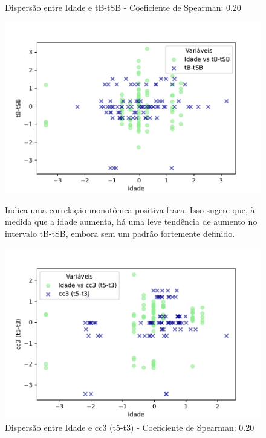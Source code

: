 \begin{figure}[h]
    \captionsetup{font=footnotesize, justification=centering, labelsep=period, position=above}
    \centering
    \begin{minipage}[b]{0.45\linewidth}
        \caption{Dispersão entre Idade e tB-tSB - Coeficiente de Spearman: 0.20}
        \label{fig:idade-tB-tSB}
        \centering
        \includegraphics[scale=0.47]{figuras/Spearman/idade-tB-tSB.pdf}
        \vspace{0.3cm}
        \caption{Indica uma correlação monotônica positiva fraca. Isso sugere que, à medida que a idade aumenta, há uma leve tendência de aumento no intervalo tB-tSB, embora sem um padrão fortemente definido. }
        \begin{minipage}{\linewidth}
            \centering
        \end{minipage}
    \end{minipage}
    \hspace{0.05\linewidth}
    \begin{minipage}[b]{0.45\linewidth}
        \caption{Dispersão entre Idade e cc3 (t5-t3) - Coeficiente de Spearman: 0.20}
        \label{fig:idade-cc3}
        \centering
        \includegraphics[scale=0.47]{figuras/Spearman/idade-cc3.pdf}

\end{minipage}
\end{figure}
